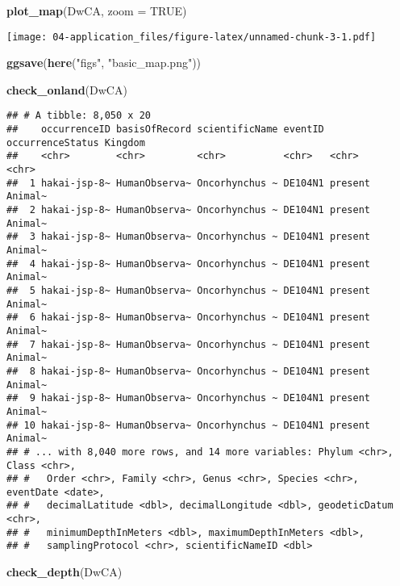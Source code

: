 \documentclass[]{book}
\newenvironment{Shaded}{\begin{snugshade}}{\end{snugshade}}
\newcommand{\DataTypeTok}[1]{\textcolor[rgb]{0.13,0.29,0.53}{#1}}
\newcommand{\KeywordTok}[1]{\textcolor[rgb]{0.13,0.29,0.53}{\textbf{#1}}}
\newcommand{\NormalTok}[1]{#1}
\newcommand{\OtherTok}[1]{\textcolor[rgb]{0.56,0.35,0.01}{#1}}
\newcommand{\StringTok}[1]{\textcolor[rgb]{0.31,0.60,0.02}{#1}}
\begin{document}
\begin{Shaded}
\begin{Highlighting}[]
\KeywordTok{plot_map}\NormalTok{(DwCA, }\DataTypeTok{zoom =} \OtherTok{TRUE}\NormalTok{)}
\end{Highlighting}
\end{Shaded}

\texttt{[image: 04-application\_files/figure-latex/unnamed-chunk-3-1.pdf]}

\begin{Shaded}
\begin{Highlighting}[]
\KeywordTok{ggsave}\NormalTok{(}\KeywordTok{here}\NormalTok{(}\StringTok{"figs"}\NormalTok{, }\StringTok{"basic_map.png"}\NormalTok{))}

\KeywordTok{check_onland}\NormalTok{(DwCA)}
\end{Highlighting}
\end{Shaded}

\begin{verbatim}
## # A tibble: 8,050 x 20
##    occurrenceID basisOfRecord scientificName eventID occurrenceStatus Kingdom
##    <chr>        <chr>         <chr>          <chr>   <chr>            <chr>  
##  1 hakai-jsp-8~ HumanObserva~ Oncorhynchus ~ DE104N1 present          Animal~
##  2 hakai-jsp-8~ HumanObserva~ Oncorhynchus ~ DE104N1 present          Animal~
##  3 hakai-jsp-8~ HumanObserva~ Oncorhynchus ~ DE104N1 present          Animal~
##  4 hakai-jsp-8~ HumanObserva~ Oncorhynchus ~ DE104N1 present          Animal~
##  5 hakai-jsp-8~ HumanObserva~ Oncorhynchus ~ DE104N1 present          Animal~
##  6 hakai-jsp-8~ HumanObserva~ Oncorhynchus ~ DE104N1 present          Animal~
##  7 hakai-jsp-8~ HumanObserva~ Oncorhynchus ~ DE104N1 present          Animal~
##  8 hakai-jsp-8~ HumanObserva~ Oncorhynchus ~ DE104N1 present          Animal~
##  9 hakai-jsp-8~ HumanObserva~ Oncorhynchus ~ DE104N1 present          Animal~
## 10 hakai-jsp-8~ HumanObserva~ Oncorhynchus ~ DE104N1 present          Animal~
## # ... with 8,040 more rows, and 14 more variables: Phylum <chr>, Class <chr>,
## #   Order <chr>, Family <chr>, Genus <chr>, Species <chr>, eventDate <date>,
## #   decimalLatitude <dbl>, decimalLongitude <dbl>, geodeticDatum <chr>,
## #   minimumDepthInMeters <dbl>, maximumDepthInMeters <dbl>,
## #   samplingProtocol <chr>, scientificNameID <dbl>
\end{verbatim}

\begin{Shaded}
\begin{Highlighting}[]
\KeywordTok{check_depth}\NormalTok{(DwCA)}
\end{Highlighting}
\end{Shaded}
\end{document}
